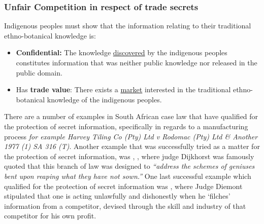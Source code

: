 \documentclass[11pt]{article}
\begin{document}
\subsubsection{Unfair Competition in respect of trade secrets}
\label{sec:orgf8c51a3}

Indigenous peoples must show that the information relating to their traditional
ethno-botanical knowledge is:
\begin{itemize}
\item \textbf{Confidential:} The knowledge \uline{discovered} by the indigenous peoples
constitutes information that was neither public knowledge nor released in the
public domain.
\item Has \textbf{trade value}: There exists a \uline{market} interested in the traditional
ethno-botanical knowledge of the indigenous peoples.
\end{itemize}

There are a number of examples in South African case law that have qualified for
the protection of secret information, specifically in regards to a manufacturing
process \emph{for example Harvey Tiling Co (Pty) Ltd v Rodomac (Pty) Ltd \& Another
1977 (1) SA 316 (T)}. Another example that was successfully tried as a matter
for the protection of secret information, was
, \cite{dijkhorst81_atlas_v_pikkewyn}, where
judge Dijkhorst was famously quoted that this branch of law was designed to
\emph{``address the schemes of geniuses bent upon reaping what they have not sown.''}
One last successful example which qualified for the protection of secret
information was 
\cite{diemont72_stellwinetrust_v_oudemeester}, where Judge Diemont stipulated that
one is acting unlawfully and dishonestly when he `filches' information from a
competitor, devised through the skill and industry of that competitor for his
own profit.\\
\end{document}
